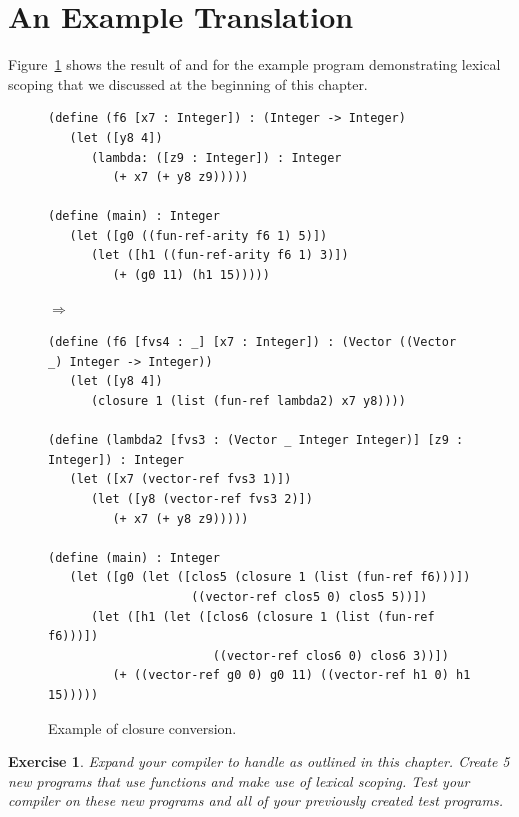 \documentclass[7x10]{TimesAPriori_MIT}%
\newtheorem{exercise}[theorem]{Exercise}
\begin{document}
\section{An Example Translation}
\label{sec:example-lambda}

Figure~\ref{fig:lexical-functions-example} shows the result of
 and  for the example
program demonstrating lexical scoping that we discussed at the
beginning of this chapter.


\begin{figure}[tbp]
  \begin{minipage}{0.8\textwidth}
\begin{lstlisting}[basicstyle=\ttfamily\footnotesize]
(define (f6 [x7 : Integer]) : (Integer -> Integer)
   (let ([y8 4])
      (lambda: ([z9 : Integer]) : Integer
         (+ x7 (+ y8 z9)))))

(define (main) : Integer
   (let ([g0 ((fun-ref-arity f6 1) 5)])
      (let ([h1 ((fun-ref-arity f6 1) 3)])
         (+ (g0 11) (h1 15)))))
\end{lstlisting}
$\Rightarrow$
\begin{lstlisting}[basicstyle=\ttfamily\footnotesize]
(define (f6 [fvs4 : _] [x7 : Integer]) : (Vector ((Vector _) Integer -> Integer))
   (let ([y8 4])
      (closure 1 (list (fun-ref lambda2) x7 y8))))

(define (lambda2 [fvs3 : (Vector _ Integer Integer)] [z9 : Integer]) : Integer
   (let ([x7 (vector-ref fvs3 1)])
      (let ([y8 (vector-ref fvs3 2)])
         (+ x7 (+ y8 z9)))))

(define (main) : Integer
   (let ([g0 (let ([clos5 (closure 1 (list (fun-ref f6)))])
                    ((vector-ref clos5 0) clos5 5))])
      (let ([h1 (let ([clos6 (closure 1 (list (fun-ref f6)))])
                       ((vector-ref clos6 0) clos6 3))])
         (+ ((vector-ref g0 0) g0 11) ((vector-ref h1 0) h1 15)))))
\end{lstlisting}
\end{minipage}

\caption{Example of closure conversion.}
\label{fig:lexical-functions-example}
\end{figure}

\begin{exercise}\normalfont
Expand your compiler to handle \LangLam{} as outlined in this chapter.
Create 5 new programs that use  functions and make use of
lexical scoping. Test your compiler on these new programs and all of
your previously created test programs.
\end{exercise}
\end{document}
